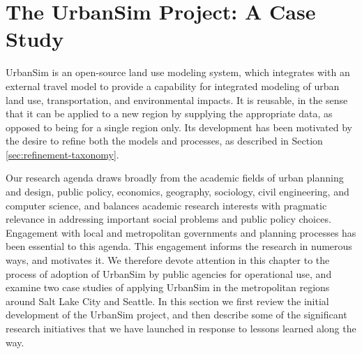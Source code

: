 
\section{The UrbanSim Project: A Case Study}

UrbanSim is an open-source land use modeling system, which integrates with
an external travel model to provide a capability for integrated modeling of
urban land use, transportation, and environmental impacts.  It is reusable,
in the sense that it can be applied to a new region by supplying the
appropriate data, as opposed to being for a single region only.  Its
development has been motivated by the desire to refine both the models and
processes, as described in Section \ref{sec:refinement-taxonomy}.

Our research agenda draws broadly from the
academic fields of urban planning and design, public policy,
economics, geography, sociology, civil engineering, and computer
science, and balances academic research interests with pragmatic
relevance in addressing important social problems and public policy
choices.  Engagement with local and metropolitan governments and
planning processes has been essential to this agenda.  This
engagement informs the research in numerous ways, and motivates it.
We therefore devote attention in this chapter to the process of
adoption of UrbanSim by public agencies for operational use, and
examine two case studies of applying UrbanSim in the metropolitan
regions around Salt Lake City and Seattle. In this section we first
review the initial development of the UrbanSim project, and then
describe some of the significant research initiatives that we have
launched in response to lessons learned along the way.

